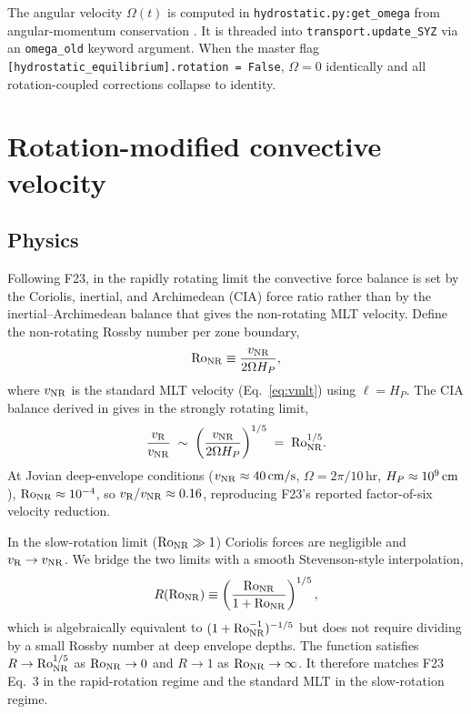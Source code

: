 \documentclass{aastex631}
\newcommand{\Hp}{H_P}
\newcommand{\VNR}{v_{\rm NR}}
\newcommand{\VR}{v_{\rm R}}
\newcommand{\Roo}{\mathrm{Ro}}
\newcommand{\Rofunc}{R(\Roo_{\rm NR})}
\begin{document}
The angular velocity $\Omega(t)$ is computed in
\texttt{hydrostatic.py:get\_omega} from angular-momentum
conservation \citep[Appendix A of][]{TejadaArevalo2026orchard}.  It is
threaded into \texttt{transport.update\_SYZ} via an
\texttt{omega\_old} keyword argument.  When the master flag
\texttt{[hydrostatic\_equilibrium].rotation = False}, $\Omega = 0$
identically and all rotation-coupled corrections collapse to identity.

\section{Rotation-modified convective velocity}\label{sec:rot}

\subsection{Physics}

Following F23, in the rapidly rotating limit the convective force
balance is set by the Coriolis, inertial, and Archimedean (CIA) force
ratio rather than by the inertial--Archimedean balance that gives the
\citet{Stevenson1979} non-rotating MLT velocity.  Define the
non-rotating Rossby number per zone boundary,
\begin{equation}
\Roo_{\rm NR} \equiv \frac{\VNR}{2\Omega\Hp},
\label{eq:Ro-NR}
\end{equation}
where $\VNR$ is the standard MLT velocity (Eq.~\ref{eq:vmlt}) using
$\ell = \Hp$.  The CIA balance derived in
\citet[][Eq.~3]{Fuentes2023ApJL} gives in the strongly rotating limit,
\begin{equation}
\frac{\VR}{\VNR}
    \;\sim\; \left(\frac{\VNR}{2\Omega\Hp}\right)^{1/5}
    \;=\; \Roo_{\rm NR}^{1/5}.
\label{eq:VRovervNR-asymp}
\end{equation}
At Jovian deep-envelope conditions ($\VNR \approx 40\,\rm cm/s$,
$\Omega = 2\pi/10\,$hr, $\Hp \approx 10^9\,\rm cm$), $\Roo_{\rm NR}
\approx 10^{-4}$, so $\VR/\VNR \approx 0.16$, reproducing
F23's reported factor-of-six velocity reduction.

In the slow-rotation limit ($\Roo_{\rm NR} \gg 1$) Coriolis forces are
negligible and $\VR \to \VNR$.  We bridge the two limits with a smooth
Stevenson-style interpolation,
\begin{equation}
\Rofunc \equiv \left(\frac{\Roo_{\rm NR}}{1 + \Roo_{\rm NR}}\right)^{1/5},
\label{eq:Rfunc}
\end{equation}
which is algebraically equivalent to $(1 + \Roo_{\rm NR}^{-1})^{-1/5}$
but does not require dividing by a small Rossby number at deep
envelope depths.  The function satisfies
$R \to \Roo_{\rm NR}^{1/5}$ as $\Roo_{\rm NR} \to 0$ and
$R \to 1$ as $\Roo_{\rm NR} \to \infty$.  It therefore matches F23
Eq.~3 in the rapid-rotation regime and the standard MLT in the
slow-rotation regime.
\end{document}
